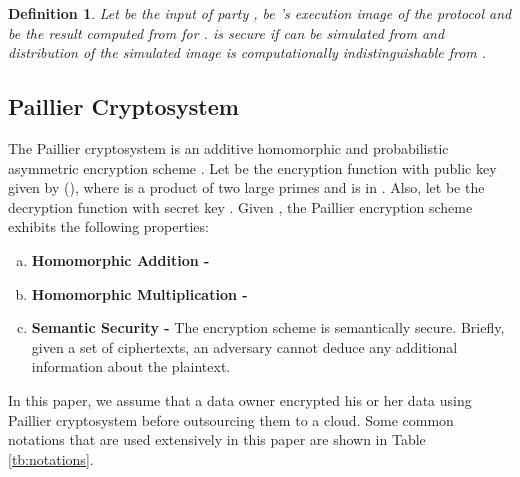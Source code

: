 \documentclass{article}
\newtheorem{definition}{Definition}
\begin{document}
\begin{definition}\label{def:semi-honest}
Let  be the input of party ,  be  's 
execution image of the protocol  and  be the result computed from  for .
 is secure if  can be simulated from
 and
distribution of the simulated image is computationally indistinguishable
from .

\end{definition}

\subsection{Paillier Cryptosystem}
The Paillier cryptosystem is an additive homomorphic and probabilistic 
asymmetric encryption scheme \cite{paillier-99}. Let  be the encryption 
function with public key  given by (), where  is a product of two large primes and 
 is in . Also, let  be 
the decryption function with secret key . 
Given , the Paillier encryption scheme exhibits the following properties:

\begin{enumerate}[a.]
     \item \textbf{Homomorphic Addition -} 
     \item \textbf{Homomorphic Multiplication -} 
     \item \textbf{Semantic Security -} The encryption scheme is semantically 
secure\cite{goldwasser-89,Goldreichnc}. Briefly, given a set of ciphertexts, an 
adversary cannot deduce any additional information about the plaintext. 
\end{enumerate}
In this paper, we assume that a data owner encrypted his or her data using 
Paillier cryptosystem before outsourcing them to a cloud. Some common 
notations that are used extensively in this paper are shown in Table \ref{tb:notations}.
\end{document}
